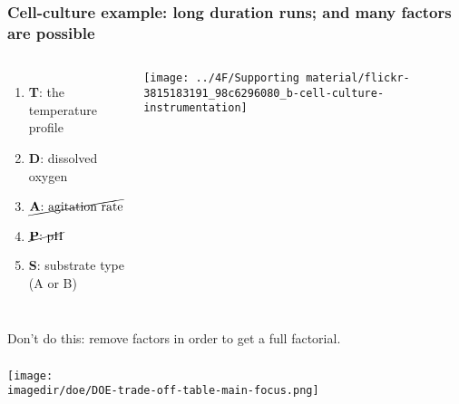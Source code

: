 \documentclass[11pt,aspectratio=169,mathserif]{beamer}
\begin{document}
\begin{frame}\frametitle{Cell-culture example: long duration runs; and many factors are possible}
	\begin{columns}[c]
			\begin{enumerate}
				\item	\textbf{T}: the temperature profile
				\item	\textbf{D}: dissolved oxygen
				\item	$\cancel{\text{\textbf{A}: agitation rate}}$
				\item	$\cancel{\text{\textbf{P}: pH}}$
				\item	\textbf{S}: substrate type (A or B)
			\end{enumerate}
		
			
			\vspace{0.2cm}
			
			\centerline{\texttt{[image: ../4F/Supporting material/flickr-3815183191\_98c6296080\_b-cell-culture-instrumentation]}}
	\end{columns}

	\vfill
	{\color{red} Don't do this:} remove factors in order to get a full factorial.
	
\end{frame}

\begin{frame}\frametitle{}
	\centerline{\texttt{[image: \\imagedir/doe/DOE-trade-off-table-main-focus.png]}}
\end{frame}
\end{document}
